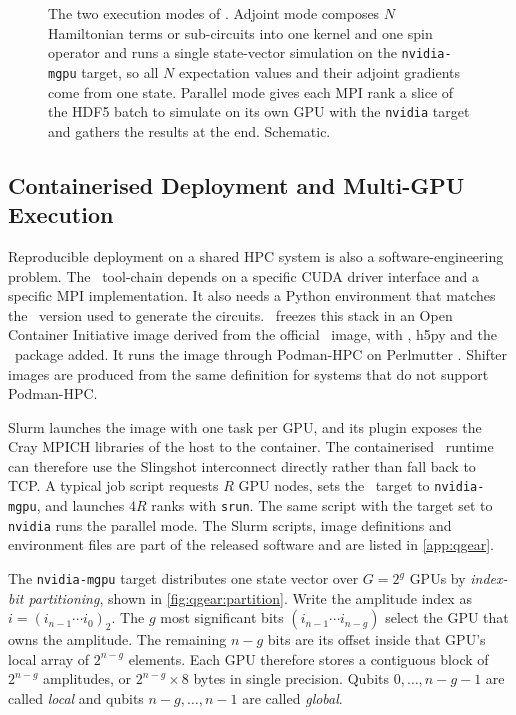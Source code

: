 \begin{figure}[htbp]
\caption{The two execution modes of \qgear. Adjoint mode composes $N$ Hamiltonian terms or sub-circuits into one kernel and one spin operator and runs a single state-vector simulation on the \texttt{nvidia-mgpu} target, so all $N$ expectation values and their adjoint gradients come from one state. Parallel mode gives each MPI rank a slice of the HDF5 batch to simulate on its own GPU with the \texttt{nvidia} target and gathers the results at the end. Schematic.}
\label{fig:qgear:modes}
\end{figure}

\subsection{Containerised Deployment and Multi-GPU Execution}\label{sec:qgear:deploy}

Reproducible deployment on a shared HPC system is also a software-engineering problem. The \cudaq\ tool-chain depends on a specific CUDA driver interface and a specific MPI implementation. It also needs a Python environment that matches the \qiskit\ version used to generate the circuits. \qgear\ freezes this stack in an Open Container Initiative image derived from the official \cudaq\ image, with \qiskit, h5py and the \qgear\ package added. It runs the image through Podman-HPC on Perlmutter \cite{stephey2022podman}. Shifter images are produced from the same definition for systems that do not support Podman-HPC.

Slurm launches the image with one task per GPU, and its plugin exposes the Cray MPICH libraries of the host to the container. The containerised \cudaq\ runtime can therefore use the Slingshot interconnect directly rather than fall back to TCP. A typical job script requests $R$ GPU nodes, sets the \cudaq\ target to \texttt{nvidia-mgpu}, and launches $4R$ ranks with \texttt{srun}. The same script with the target set to \texttt{nvidia} runs the parallel mode. The Slurm scripts, image definitions and environment files are part of the released software \cite{guo2025qgearsoftware} and are listed in \cref{app:qgear}.

The \texttt{nvidia-mgpu} target distributes one state vector over $G=2^{g}$ GPUs by \emph{index-bit partitioning}, shown in \cref{fig:qgear:partition}. Write the amplitude index as $i=(i_{n-1}\cdots i_{0})_{2}$. The $g$ most significant bits $(i_{n-1}\cdots i_{n-g})$ select the GPU that owns the amplitude. The remaining $n-g$ bits are its offset inside that GPU's local array of $2^{n-g}$ elements. Each GPU therefore stores a contiguous block of $2^{n-g}$ amplitudes, or $2^{n-g}\times 8$ bytes in single precision. Qubits $0,\dots,n-g-1$ are called \emph{local} and qubits $n-g,\dots,n-1$ are called \emph{global}.

